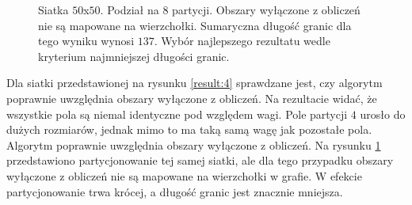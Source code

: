 \begin{figure}[h]
\begin{subfigure}{.33\textwidth}
    \caption[short]{}
\end{subfigure}
\caption{Siatka $50$x$50$. Podział na $8$ partycji. Obszary wyłączone z obliczeń nie są mapowane na wierzchołki.
Sumaryczna długość granic dla tego wyniku wynosi $137$.
Wybór najlepszego rezultatu wedle kryterium najmniejszej długości granic.}
\label{result:1}
\end{figure}

Dla siatki przedstawionej na rysunku \ref{result:4} sprawdzane jest, czy algorytm poprawnie uwzględnia obszary wyłączone z obliczeń.
Na rezultacie widać, że wszystkie pola są niemal identyczne pod względem wagi.
Pole partycji $4$ urosło do dużych rozmiarów, jednak mimo to ma taką samą wagę jak pozostałe pola.
Algorytm poprawnie uwzględnia obszary wyłączone z obliczeń.
Na rysunku \ref{result:1} przedstawiono partycjonowanie tej samej siatki, ale dla tego przypadku obszary wyłączone
z obliczeń nie są mapowane na wierzchołki w grafie.
W efekcie partycjonowanie trwa krócej, a długość granic jest znacznie mniejsza.

